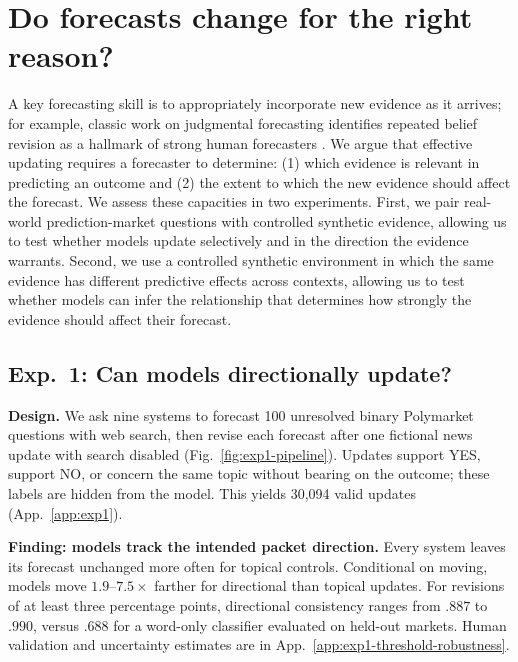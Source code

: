 \section{Do forecasts change for the right reason?}
\label{sec:evidence}

A key forecasting skill is to appropriately incorporate new evidence as it
arrives; for example, classic work on judgmental forecasting identifies repeated
belief revision as a hallmark of strong human forecasters
\citep{tetlock2005expert}. We argue that effective updating requires a forecaster
to determine: (1) which evidence is relevant in predicting an outcome and (2) the
extent to which the new evidence should affect the forecast. We assess these
capacities in two experiments. First, we pair real-world prediction-market
questions with controlled synthetic evidence, allowing us to test whether models
update selectively and in the direction the evidence warrants. Second, we use a
controlled synthetic environment in which the same evidence has different
predictive effects across contexts, allowing us to test whether models can infer
the relationship that determines how strongly the evidence should affect their
forecast.

\subsection{Exp.~1: Can models directionally update?}
\label{sec:exp1}

\noindent\textbf{Design.}
We ask nine systems to forecast 100 unresolved binary Polymarket questions
with web search, then revise each forecast after one fictional news update with
search disabled (Fig.~\ref{fig:exp1-pipeline}). Updates support YES, support NO,
or concern the same topic without bearing on the outcome; these labels are hidden
from the model. This yields 30,094 valid updates
(App.~\ref{app:exp1}).

\noindent\textbf{Finding: models track the intended packet direction.}
Every system leaves its forecast unchanged more often for topical controls.
Conditional on moving, models move $1.9$--$7.5\times$ farther for directional
than topical updates. For revisions of at least three percentage points,
directional consistency ranges from $.887$ to $.990$, versus $.688$ for a
word-only classifier evaluated on held-out markets. Human validation and
uncertainty estimates are in App.~\ref{app:exp1-threshold-robustness}.

